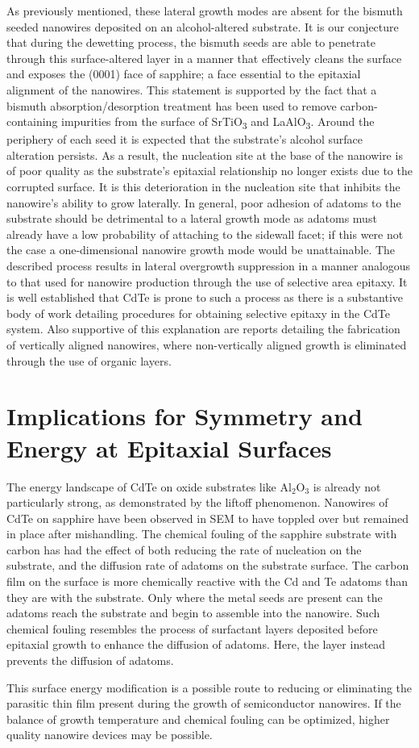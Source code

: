As previously mentioned, these lateral growth modes are absent for the bismuth seeded nanowires deposited on an alcohol-altered substrate.
It is our conjecture that during the dewetting process, the bismuth seeds are able to penetrate through this surface-altered layer in a manner that effectively cleans the surface and exposes the (0001) face of sapphire; a face essential to the epitaxial alignment of the nanowires.
This statement is supported by the fact that a bismuth absorption/desorption treatment has been used to remove carbon-containing impurities from the surface of SrTiO\textsubscript{3} and LaAlO\textsubscript{3}\cite{Watanabe1991a}.
Around the periphery of each seed it is expected that the substrate's alcohol surface alteration persists.
As a result, the nucleation site at the base of the nanowire is of poor quality as the substrate's epitaxial relationship no longer exists due to the corrupted surface.
It is this deterioration in the nucleation site that inhibits the nanowire's ability to grow laterally.
In general, poor adhesion of adatoms to the substrate should be detrimental to a lateral growth mode as adatoms must already have a low probability of attaching to the sidewall facet; if this were not the case a one-dimensional nanowire growth mode would be unattainable.
The described process results in lateral overgrowth suppression in a manner analogous to that used for nanowire production through the use of selective area epitaxy.
It is well established that CdTe is prone to such a process as there is a substantive body of work detailing procedures for obtaining selective epitaxy in the CdTe system\cite{Sporken2000,Zhang2001a,Bhat2006a}.
Also supportive of this explanation are reports detailing the fabrication of vertically aligned nanowires, where non-vertically aligned growth is eliminated through the use of organic layers\cite{Krishnamachari2004,Mikkelsen2005,Martensson2007}.

\section{Implications for Symmetry and Energy at Epitaxial Surfaces}
The energy landscape of CdTe on oxide substrates like Al\(_2\)O\(_3\) is already not particularly strong, as demonstrated by the liftoff phenomenon.
Nanowires of CdTe on sapphire have been observed in SEM to have toppled over but remained in place after mishandling.
The chemical fouling of the sapphire substrate with carbon has had the effect of both reducing the rate of nucleation on the substrate, and the diffusion rate of adatoms on the substrate surface.
The carbon film on the surface is more chemically reactive with the Cd and Te adatoms than they are with the substrate.
Only where the metal seeds are present can the adatoms reach the substrate and begin to assemble into the nanowire.
Such chemical fouling resembles the process of surfactant layers deposited before epitaxial growth to enhance the diffusion of adatoms\cite{PhysRevLett.63.632}.
Here, the layer instead prevents the diffusion of adatoms.

This surface energy modification is a possible route to reducing or eliminating the parasitic thin film present during the growth of semiconductor nanowires.
If the balance of growth temperature and chemical fouling can be optimized, higher quality nanowire devices may be possible.
